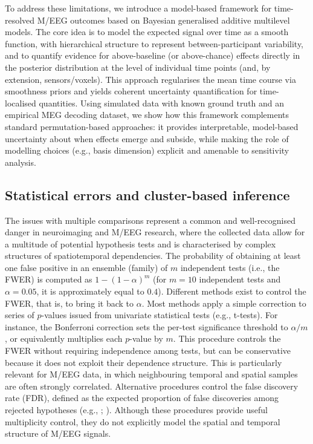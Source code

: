 \documentclass[
  doc,
  floatsintext,
  longtable,
  a4paper,
  nolmodern,
  notxfonts,
  notimes,
  colorlinks=true,linkcolor=blue,citecolor=blue,urlcolor=blue]{apa7}
\begin{document}
To address these limitations, we introduce a model-based framework for
time-resolved M/EEG outcomes based on Bayesian generalised additive
multilevel models. The core idea is to model the expected signal over
time as a smooth function, with hierarchical structure to represent
between-participant variability, and to quantify evidence for
above-baseline (or above-chance) effects directly in the posterior
distribution at the level of individual time points (and, by extension,
sensors/voxels). This approach regularises the mean time course via
smoothness priors and yields coherent uncertainty quantification for
time-localised quantities. Using simulated data with known ground truth
and an empirical MEG decoding dataset, we show how this framework
complements standard permutation-based approaches: it provides
interpretable, model-based uncertainty about when effects emerge and
subside, while making the role of modelling choices (e.g., basis
dimension) explicit and amenable to sensitivity analysis.

\subsection{Statistical errors and cluster-based
inference}\label{statistical-errors-and-cluster-based-inference}

The issues with multiple comparisons represent a common and
well-recognised danger in neuroimaging and M/EEG research, where the
collected data allow for a multitude of potential hypothesis tests and
is characterised by complex structures of spatiotemporal dependencies.
The probability of obtaining at least one false positive in an ensemble
(family) of \(m\) independent tests (i.e., the FWER) is computed as
\(1-\left(1-\alpha\right)^{m}\) (for \(m=10\) independent tests and
\(\alpha=0.05\), it is approximately equal to \(0.4\)). Different
methods exist to control the FWER, that is, to bring it back to
\(\alpha\). Most methods apply a simple correction to series of
\(p\)-values issued from univariate statistical tests (e.g., t-tests).
For instance, the Bonferroni correction sets the per-test significance
threshold to \(\alpha/m\), or equivalently multiplies each \(p\)-value
by \(m\). This procedure controls the FWER without requiring
independence among tests, but can be conservative because it does not
exploit their dependence structure. This is particularly relevant for
M/EEG data, in which neighbouring temporal and spatial samples are often
strongly correlated. Alternative procedures control the false discovery
rate (FDR), defined as the expected proportion of false discoveries
among rejected hypotheses (e.g., ; ). Although these procedures provide useful multiplicity control,
they do not explicitly model the spatial and temporal structure of M/EEG
signals.
\end{document}
